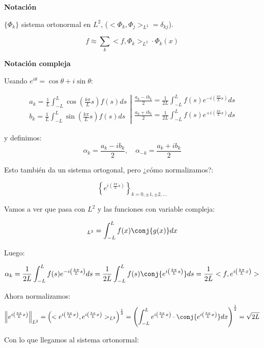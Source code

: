 		\textbf{Notación}

		$\{ \Phi_k \} $ sistema ortonormal en $L^2$, ($<\Phi_k,\Phi_j>_{L^2} = \delta_{kj}$).

		\[ f ≈ \sum_k < f, \Phi_k >_{L^2} \cdot \Phi_k (x) \]

		\textbf{Notación compleja}

		Usando $e^{i\theta} = \cos \theta + i \sin \theta$:

		\[
		\left. \begin{array}{r}
			a_k = \frac{1}{L} \int^{L}_{-L} \cos \left( \frac{k \pi}{L} s \right) f(s) ds\\
			b_k = \frac{1}{L} \int^{L}_{-L} \sin \left( \frac{k \pi}{L} s \right) f(s) ds
		\end{array} \right| \begin{array}{l}
			\frac{a_k - ib_k}{2} = \frac{1}{2L} \int_{-L}^L f(s) e^{-i \left( \frac{k \pi}{L} s \right)} ds \\
			\frac{a_k + ib_k}{2} = \frac{1}{2L} \int_{-L}^L f(s) e^{+i \left( \frac{k \pi}{L} s \right)} ds \\
		\end{array}
		\]

		y definimos:
		\[
			\alpha_k = \frac{a_k - ib_k}{2}, \quad \alpha_{-k} = \frac{a_k + ib_k}{2}
		\]

		Esto también da un sistema ortogonal, pero ¿cómo normalizamos?:

		\[\left\{ e^{i \left( \frac{k \pi}{L} s \right)} \right\}_{k = 0,±1,±2,…} \]

		Vamos a ver que pasa con $L^2$ y las funciones con variable compleja:

		\[<f,g>_{L^2} = \int^L_{-L} f(x) \conj{g(x)} dx \]

		Luego:

		\[ \alpha_k = \frac{1}{2L} \int^L_{-L} f(s) e^{-i \left( \frac{k \pi}{L} s \right)} ds = \frac{1}{2L} \int_{-L}^L f(s) \conj{e^{i \left( \frac{k \pi}{L} s \right)}} ds = \frac{1}{2L} <f, e^{i \left( \frac{k \pi}{L} x \right)}> \]

		Ahora normalizamos:
		\[
		\left\|e^{i \left( \frac{k \pi}{L} x \right)}\right\|_{L^2} = \left( < e^{i \left( \frac{k \pi}{L} x \right)}, e^{i \left( \frac{k \pi}{L} x \right)} >_{L^2} \right)^{\frac{1}{2}} = \left( \int^{L}_{-L} e^{i \left( \frac{k \pi}{L} x \right)} \cdot \conj{ e^{i \left( \frac{k \pi}{L} x \right)}} dx \right)^{\frac{1}{2}} = \sqrt{2L}
		\]

		Con lo que llegamos al sistema ortonormal:

